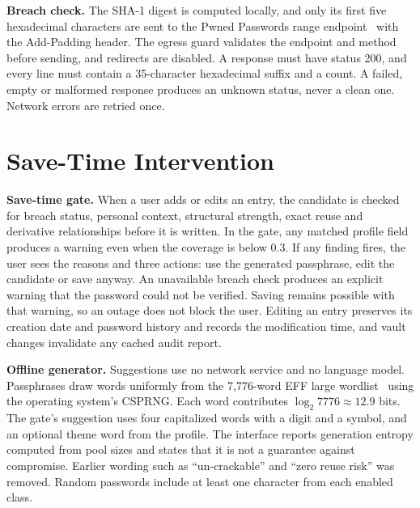 \documentclass[conference]{IEEEtran}
\begin{document}
\textbf{Breach check.} The SHA-1 digest is computed locally, and only its first five hexadecimal characters are sent to the Pwned Passwords range endpoint~\cite{hibp} with the Add-Padding header. The egress guard validates the endpoint and method before sending, and redirects are disabled. A response must have status 200, and every line must contain a 35-character hexadecimal suffix and a count. A failed, empty or malformed response produces an unknown status, never a clean one. Network errors are retried once.

\section{Save-Time Intervention}
\textbf{Save-time gate.} When a user adds or edits an entry, the candidate is checked for breach status, personal context, structural strength, exact reuse and derivative relationships before it is written. In the gate, any matched profile field produces a warning even when the coverage is below 0.3. If any finding fires, the user sees the reasons and three actions: use the generated passphrase, edit the candidate or save anyway. An unavailable breach check produces an explicit warning that the password could not be verified. Saving remains possible with that warning, so an outage does not block the user. Editing an entry preserves its creation date and password history and records the modification time, and vault changes invalidate any cached audit report.

\textbf{Offline generator.} Suggestions use no network service and no language model. Passphrases draw words uniformly from the 7,776-word EFF large wordlist~\cite{eff} using the operating system's CSPRNG. Each word contributes $\log_2 7776\approx 12.9$ bits. The gate's suggestion uses four capitalized words with a digit and a symbol, and an optional theme word from the profile. The interface reports generation entropy computed from pool sizes and states that it is not a guarantee against compromise. Earlier wording such as ``un-crackable'' and ``zero reuse risk'' was removed. Random passwords include at least one character from each enabled class.
\end{document}
